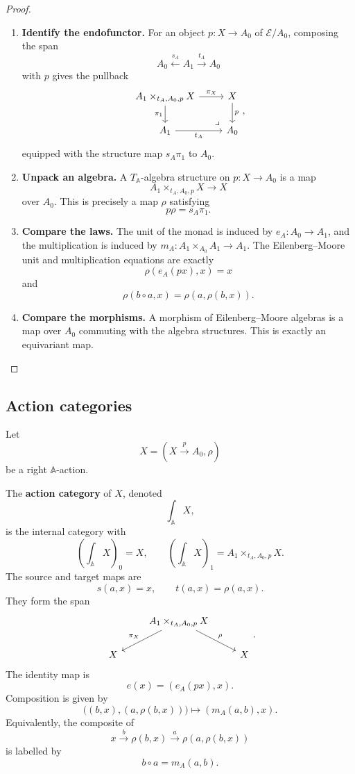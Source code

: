 \begin{proof}
\leavevmode
\begin{enumerate}
\item \textbf{Identify the endofunctor.}
For an object \(p:X\to A_0\) of \(\mathcal E/A_0\), composing the span
\[
A_0\xleftarrow{s_A}A_1\xrightarrow{t_A}A_0
\]
with \(p\) gives the pullback
\[
\begin{tikzcd}
A_1\times_{t_A,A_0,p}X
\arrow[r,"\pi_X"]
\arrow[d,"\pi_1"']
&
X
\arrow[d,"p"]
\\
A_1
\arrow[r,"t_A"']
&
A_0
\arrow[ul,phantom,very near start,"\lrcorner"]
\end{tikzcd}
,
\]
equipped with the structure map \(s_A\pi_1\) to \(A_0\).

\item \textbf{Unpack an algebra.}
A \(T_{\mathbb A}\)-algebra structure on \(p:X\to A_0\) is a map
\[
A_1\times_{t_A,A_0,p}X\to X
\]
over \(A_0\). This is precisely a map \(\rho\) satisfying
\[
p\rho=s_A\pi_1.
\]

\item \textbf{Compare the laws.}
The unit of the monad is induced by \(e_A:A_0\to A_1\), and the multiplication
is induced by \(m_A:A_1\times_{A_0}A_1\to A_1\). The Eilenberg--Moore unit
and multiplication equations are exactly
\[
\rho(e_A(px),x)=x
\]
and
\[
\rho(b\circ a,x)=\rho(a,\rho(b,x)).
\]

\item \textbf{Compare the morphisms.}
A morphism of Eilenberg--Moore algebras is a map over \(A_0\) commuting with
the algebra structures. This is exactly an equivariant map.
\end{enumerate}
\end{proof}

\subsection{Action categories}
\label{subsec:relative-action-categories}

Let
\[
X=(X\xrightarrow{p}A_0,\rho)
\]
be a right \(\mathbb A\)-action.

\begin{definition}
\label{def:relative-action-category}
The \textbf{action category} of \(X\), denoted
\[
\int_{\mathbb A}X,
\]
is the internal category with
\[
\left(\int_{\mathbb A}X\right)_0=X,
\qquad
\left(\int_{\mathbb A}X\right)_1
=
A_1\times_{t_A,A_0,p}X.
\]
The source and target maps are
\[
s(a,x)=x,
\qquad
t(a,x)=\rho(a,x).
\]
They form the span
\[
\begin{tikzcd}
& A_1\times_{t_A,A_0,p}X
\arrow[dl,"\pi_X"']
\arrow[dr,"\rho"]
&
\\
X && X
\end{tikzcd}
.
\]
The identity map is
\[
e(x)=(e_A(px),x).
\]
Composition is given by
\[
\bigl((b,x),(a,\rho(b,x))\bigr)
\longmapsto
(m_A(a,b),x).
\]
Equivalently, the composite of
\[
x\xrightarrow{\,b\,}\rho(b,x)
\xrightarrow{\,a\,}\rho(a,\rho(b,x))
\]
is labelled by
\[
b\circ a=m_A(a,b).
\]
\end{definition}

